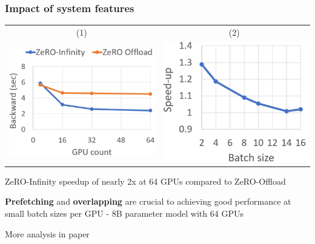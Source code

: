 \documentclass{beamer}
\begin{document}
\begin{frame}
    \frametitle{Impact of system features}
    \begin{center}
        \begin{tabular}{ c c }
        \tiny{(1)} & \tiny{(2)}\\
        \includegraphics[scale=1.2]{img/zero_infinity_backward_time.png}
        & \includegraphics[scale=1.2]{img/zero_infinity_batch_size.png}
        \end{tabular}
        \begin{enumerate}
        	\tiny{\item ZeRO-Infinity speedup of nearly 2x at 64 GPUs compared to ZeRO-Offload}
        	\tiny{\item \textbf{Prefetching} and \textbf{overlapping} are crucial to achieving good performance at small batch sizes per GPU - 8B parameter model with 64 GPUs}
        \end{enumerate}
    \end{center}
    \tiny{More analysis in paper}
\end{frame}
\end{document}
